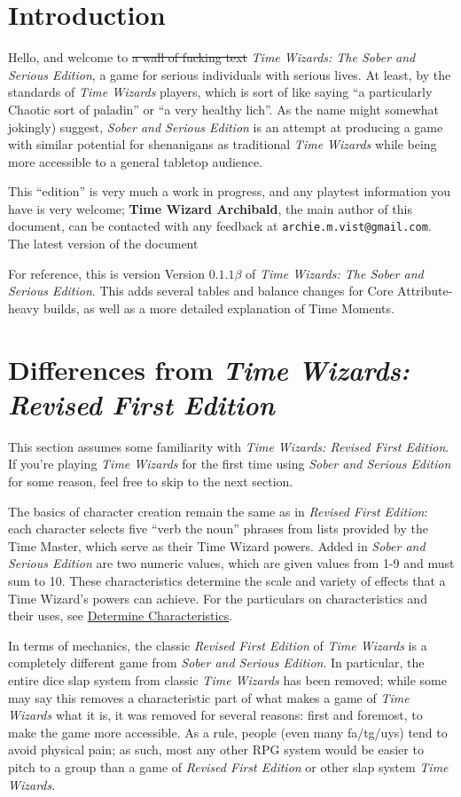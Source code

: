 \documentclass{article}
\newcommand{\twsse}{\emph{Time Wizards: The Sober and Serious Edition}}
\newcommand{\tw}{\emph{Time Wizards}}
\newcommand{\sse}{\emph{Sober and Serious Edition}}
\newcommand{\rfe}{\emph{Revised First Edition}}
\newcommand{\vers}{Version $0.1.1 \beta$}
\newcommand{\namefag}[2][]{{\color{anongreen} \textbf{#2}#1}}
\begin{document}

\cleardoublepage

\section{Introduction}
Hello, and welcome to \sout{a wall of fucking text} \twsse{}, a game for serious individuals
with serious lives. At least, by the standards of \tw{} players, which is sort of like saying
``a particularly Chaotic sort of paladin'' or ``a very healthy lich''. As the name might 
somewhat jokingly) suggest, \sse{} is an attempt at producing a game with similar potential for
shenanigans as traditional \tw{} while being more accessible to a general tabletop audience.

This ``edition'' is very much a work in progress, and any playtest information you have is very
welcome; \namefag{Time Wizard Archibald}, the main author of this document, can be contacted with
any feedback at \verb|archie.m.vist@gmail.com|. The latest version of the document 

For reference, this is version \vers{} of \twsse. This adds several tables and balance changes
for Core Attribute-heavy builds, as well as a more detailed explanation of Time Moments.

\section{Differences from \emph{Time Wizards: Revised First Edition}}
This section assumes some familiarity with \emph{Time Wizards: Revised First Edition}. If you're
playing \tw{} for the first time using \sse{} for some reason, feel free to skip to the next
section.

The basics of character creation remain the same as in \rfe{}: each character selects five ``verb
the noun'' phrases from lists provided by the Time Master, which serve as their Time Wizard
powers. Added in \sse{} are two numeric values, which are given values from 1-9 and must sum to
10. These characteristics determine the scale and variety of effects that a Time Wizard's powers
can achieve. For the particulars on characteristics and their uses, see
\hyperref[ssec:get-characteristics] {Determine Characteristics}.

In terms of mechanics, the classic \rfe{} of \tw{} is a completely different game from \sse{}.
In particular, the entire dice slap system from classic \tw{} has been removed; while some may
say this removes a characteristic part of what makes a game of \tw{} what it is, it was removed
for several reasons: first and foremost, to make the game more accessible. As a rule, people
(even many fa/tg/uys) tend to avoid physical pain; as such, most any other RPG system would be
easier to pitch to a group than a game of \rfe{} or other slap system \tw{}.
\end{document}
